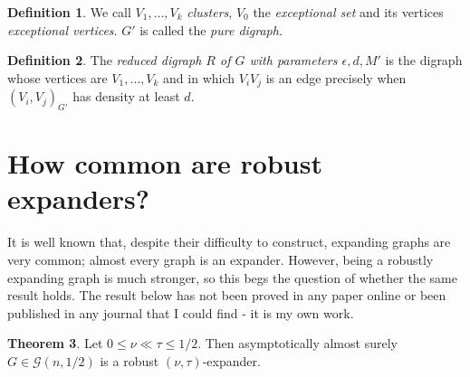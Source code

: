\documentclass[10pt,letterpaper, reqno]{amsart}
\theoremstyle{definition}
\newtheorem{thm}{Theorem}[section]
\newtheorem{defn}[thm]{Definition}
\numberwithin{equation}{section}
\begin{document}
\begin{defn}
	We call $V_1, \dots, V_k$ \textit{clusters}, $V_0$ the \textit{exceptional set} and its vertices \textit{exceptional vertices}. $G'$ is called the \textit{pure digraph}.
\end{defn}

\begin{defn}
	The \textit{reduced digraph $R$ of $G$ with parameters $\epsilon, d, M'$} is the digraph whose vertices are $V_1, \dots, V_k$ and in which $V_iV_j$ is an edge precisely when $(V_i,V_j)_{G'}$ has density at least $d$. 
\end{defn}


\section{How common are robust expanders?}

\noindent It is well known that, despite their difficulty to construct, expanding graphs are very common; almost every graph is an expander. However, being a robustly expanding graph is much stronger, so this begs the question of whether the same result holds. The result below has not been proved in any paper online or been published in any journal that I could find - it is my own work. 
\begin{thm}
	Let $0 \leq \nu \ll \tau \leq 1/2$. Then asymptotically almost surely $G \in \mathcal{G}(n,1/2)$ is a robust $(\nu,\tau)$-expander. 
\end{thm}
\end{document}
